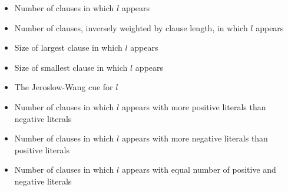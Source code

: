 \documentclass{article}
\begin{document}
\begin{itemize}
    \item Number of clauses in which $l$ appears
    \item Number of clauses, inversely weighted by clause length, in which $l$ appears
    \item Size of largest clause in which $l$ appears
    \item Size of smallest clause in which $l$ appears
    \item The Jeroslow-Wang cue for $l$
    \item Number of clauses in which $l$ appears with more positive literals than negative literals
    \item Number of clauses in which $l$ appears with more negative literals than positive literals
    \item Number of clauses in which $l$ appears with equal number of positive and negative literals
\end{itemize}

%

\end{document}
